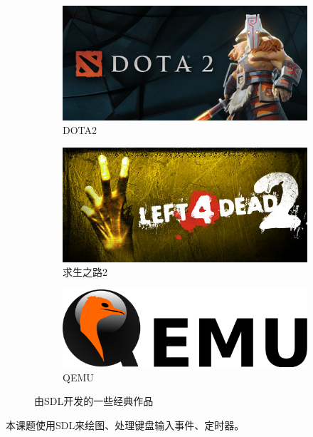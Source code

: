 \documentclass[a4paper]{ltxdoc}
\begin{document}
{\begin{figure}[h]
	\centering
		\begin{subfigure}[b]{0.3\textwidth}
			\includegraphics[width=\textwidth]{images/dota2.jpg}
			\caption{DOTA2}
		\end{subfigure}
		\begin{subfigure}[b]{0.3\textwidth}
			\includegraphics[width=\textwidth]{images/left4dead2.jpg}
			\caption{求生之路2}
		\end{subfigure}
		\begin{subfigure}[b]{0.3\textwidth}
			\includegraphics[width=\textwidth]{images/qemu.png}
			\caption{QEMU}
		\end{subfigure}
		\caption{由SDL开发的一些经典作品}
		\label{fig:sdl}
\end{figure}

本课题使用SDL来绘图、处理键盘输入事件、定时器。

}
\end{document}
